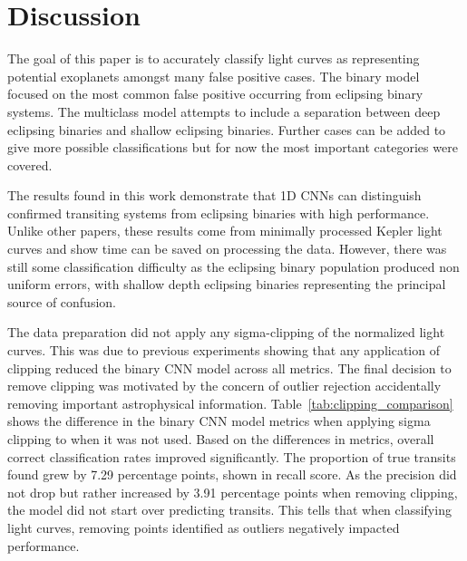 \section{Discussion}

The goal of this paper is to accurately classify light curves as representing potential exoplanets amongst many false positive cases. The binary model focused on the most common false positive occurring from eclipsing binary systems. The multiclass model attempts to include a separation between deep eclipsing binaries and shallow eclipsing binaries. Further cases can be added to give more possible classifications but for now the most important categories were covered.

The results found in this work demonstrate that 1D CNNs can distinguish confirmed transiting systems from eclipsing binaries with high performance. Unlike other papers, these results come from minimally processed Kepler light curves and show time can be saved on processing the data. However, there was still some classification difficulty as the eclipsing binary population produced non uniform errors, with shallow depth eclipsing binaries representing the principal source of confusion. 

The data preparation did not apply any sigma-clipping of the normalized light curves. This was due to previous experiments showing that any application of clipping reduced the binary CNN model across all metrics. The final decision to remove clipping was motivated by the concern of outlier rejection accidentally removing important astrophysical information. Table~\ref{tab:clipping_comparison} shows the difference in the binary CNN model metrics when applying sigma clipping to when it was not used. Based on the differences in metrics, overall correct classification rates improved significantly. The proportion of true transits found grew by 7.29 percentage points, shown in recall score. As the precision did not drop but rather increased by 3.91 percentage points when removing clipping, the model did not start over predicting transits. This tells that when classifying light curves, removing points identified as outliers negatively impacted performance.

